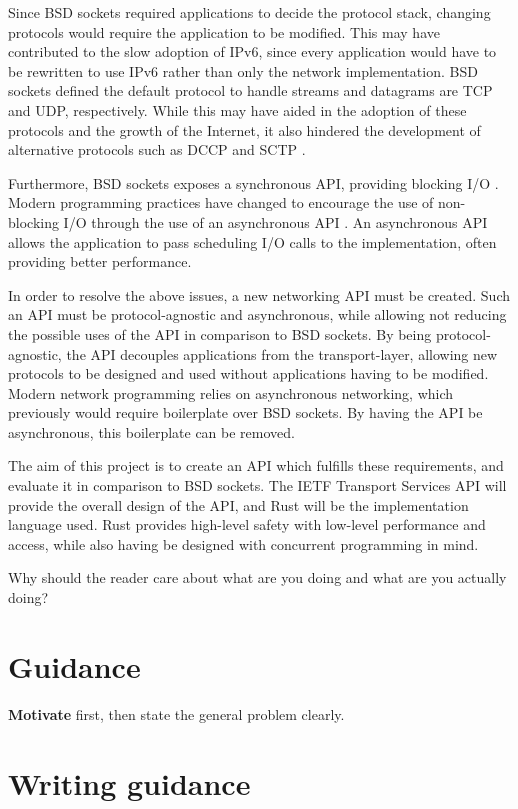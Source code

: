 \documentclass{l4proj}
\begin{document}
Since BSD sockets required applications to decide the protocol stack, changing protocols would require the application
to be modified.
This may have contributed to the slow adoption of IPv6, since every application would have to be rewritten to use IPv6
rather than only the network implementation.
BSD sockets defined the default protocol to handle streams and datagrams are TCP and UDP, respectively.
While this may have aided in the adoption of these protocols and the growth of the Internet, it also hindered the
development of alternative protocols such as DCCP and SCTP .

Furthermore, BSD sockets exposes a synchronous API, providing blocking I/O .
Modern programming practices have changed to encourage the use of non-blocking I/O through the use of an asynchronous
API .
An asynchronous API allows the application to pass scheduling I/O calls to the implementation, often providing better
performance.

In order to resolve the above issues, a new networking API must be created.
Such an API must be protocol-agnostic and asynchronous, while allowing not reducing the possible uses of the API in
comparison to BSD sockets.
By being protocol-agnostic, the API decouples applications from the transport-layer, allowing new protocols to be
designed and used without applications having to be modified.
Modern network programming relies on asynchronous networking, which previously would require boilerplate over BSD
sockets.
By having the API be asynchronous, this boilerplate can be removed.

The aim of this project is to create an API which fulfills these requirements, and evaluate it in comparison to BSD
sockets.
The IETF Transport Services API will provide the overall design of the API, and Rust will be the implementation language
used.
Rust provides high-level safety with low-level performance and access, while also having be designed with concurrent
programming in mind.


Why should the reader care about what are you doing and what are you actually doing?
\section{Guidance}

\textbf{Motivate} first, then state the general problem clearly. 

\section{Writing guidance}
\end{document}

